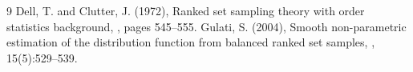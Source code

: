 \documentclass[twoside]{article}
\begin{document}
\begin{thebibliography}{9}
Dell, T. and Clutter, J. (1972),
\newblock Ranked set sampling theory with order statistics background,
, pages 545--555.
%
%
%
%
%
%
%
%
%
Gulati, S. (2004),
\newblock Smooth non-parametric estimation of the distribution function from
  balanced ranked set samples,
, 15(5):529--539.

%
%


\end{thebibliography}
\end{document}
